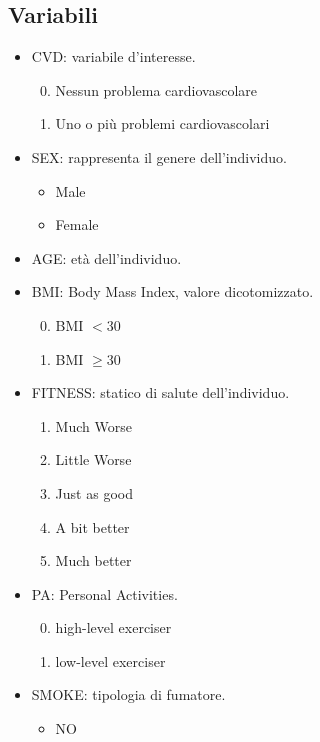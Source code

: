 \documentclass{article}\usepackage[]{graphicx}\usepackage[]{xcolor}
\begin{document}
  \subsection{Variabili}
    \begin{itemize}
      \item CVD: variabile d'interesse.
        \begin{enumerate}
          \setcounter{enumi}{-1}
          \item Nessun problema cardiovascolare
          \item Uno o più problemi cardiovascolari
        \end{enumerate}
      \item SEX: rappresenta il genere dell'individuo.
        \begin{itemize}
          \item Male
          \item Female
        \end{itemize}
      \item AGE: età dell'individuo.
      \item BMI: Body Mass Index, valore dicotomizzato.
        \begin{enumerate}
          \setcounter{enumi}{-1}
          \item BMI $< 30$
          \item BMI $\ge 30$ 
        \end{enumerate}
      \item FITNESS: statico di salute dell'individuo.
        \begin{enumerate}
          \item Much Worse 
          \item Little Worse
          \item Just as good
          \item A bit better
          \item Much better
        \end{enumerate}
      \item PA: Personal Activities.
        \begin{enumerate}
          \setcounter{enumi}{-1}
          \item high-level exerciser 
          \item low-level exerciser
        \end{enumerate}
      \item SMOKE: tipologia di fumatore.
        \begin{itemize}
          \item NO 

\end{itemize}
\end{itemize}
\end{document}
